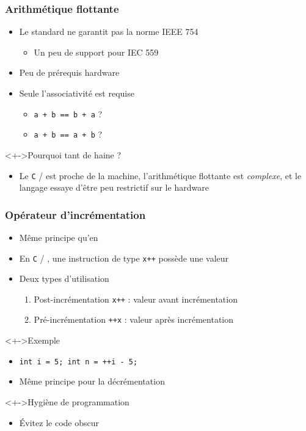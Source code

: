 \begin{frame}
\frametitle{Arithmétique flottante}
\begin{itemize}[<+->]
\item Le standard ne garantit pas la norme IEEE 754
	\begin{itemize}
	\item Un peu de support pour IEC 559
	\end{itemize}
\item Peu de prérequis hardware
\item Seule l'associativité est requise
	\begin{itemize}
	\item \texttt{a + b == b + a} ?
	\item \texttt{a + b == a + b} ?
	\end{itemize}
\end{itemize}
\begin{exampleblock}<+->{Pourquoi tant de haine ?}
	\begin{itemize}[<+->]
	\item Le \texttt{C} / \cpp est proche de la machine, l'arithmétique flottante est \emph{complexe}, et le langage essaye d'être peu restrictif sur le hardware
	\end{itemize}
\end{exampleblock}
\end{frame}

\begin{frame}
\frametitle{Opérateur d'incrémentation}
\begin{itemize}[<+->]
\item Même principe qu'en \java
\item En \texttt{C} / \cpp, une instruction de type \texttt{x++} possède une valeur
\item Deux types d'utilisation
	\begin{enumerate}
	\item Post-incrémentation \texttt{x++} : valeur avant incrémentation
	\item Pré-incrémentation \texttt{++x} : valeur après incrémentation
	\end{enumerate}
\end{itemize}
\begin{exampleblock}<+->{Exemple}
	\begin{itemize}[<+->]
	\item \lstinline|int i = 5; int n = ++i - 5;|
	\end{itemize}
\end{exampleblock}
\begin{itemize}[<+->]
\item Même principe pour la décrémentation
\end{itemize}
\begin{block}<+->{Hygiène de programmation}
	\begin{itemize}[<+->]
	\item Évitez le code obscur
	\end{itemize}
\end{block}
\end{frame}

